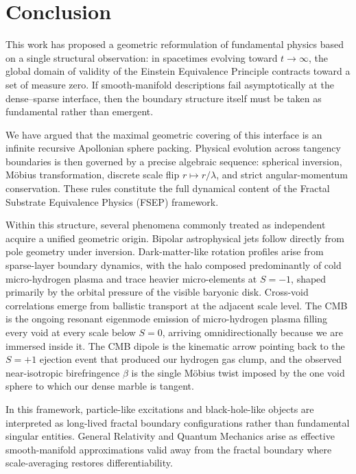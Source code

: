 \documentclass[11pt,letterpaper]{article}
\begin{document}
\section{Conclusion}
\label{sec:conclusion}

This work has proposed a geometric reformulation of fundamental physics based on a
single structural observation: in spacetimes evolving toward $t \to \infty$, the
global domain of validity of the Einstein Equivalence Principle contracts toward a
set of measure zero. If smooth-manifold descriptions fail asymptotically at the
dense--sparse interface, then the boundary structure itself must be taken as
fundamental rather than emergent.

We have argued that the maximal geometric covering of this interface is an infinite
recursive Apollonian sphere packing. Physical evolution across tangency boundaries
is then governed by a precise algebraic sequence: spherical inversion, M\"obius
transformation, discrete scale flip $r \mapsto r/\lambda$, and strict
angular-momentum conservation. These rules constitute the full dynamical content of
the Fractal Substrate Equivalence Physics (FSEP) framework.

Within this structure, several phenomena commonly treated as independent acquire a
unified geometric origin. Bipolar astrophysical jets follow directly from pole
geometry under inversion. Dark-matter-like rotation profiles arise from sparse-layer
boundary dynamics, with the halo composed predominantly of cold micro-hydrogen
plasma and trace heavier micro-elements at $S{=}{-1}$, shaped primarily by the
orbital pressure of the visible baryonic disk. Cross-void correlations emerge from
ballistic transport at the adjacent scale level. The CMB is the ongoing resonant
eigenmode emission of micro-hydrogen plasma filling every void at every scale below
$S{=}0$, arriving omnidirectionally because we are immersed inside it. The CMB
dipole is the kinematic arrow pointing back to the $S{=}+1$ ejection event that
produced our hydrogen gas clump, and the observed near-isotropic birefringence
$\beta$ is the single M\"obius twist imposed by the one void sphere to which our
dense marble is tangent.

In this framework, particle-like excitations and black-hole-like objects are
interpreted as long-lived fractal boundary configurations rather than fundamental
singular entities. General Relativity and Quantum Mechanics arise as effective
smooth-manifold approximations valid away from the fractal boundary where
scale-averaging restores differentiability.
\end{document}

